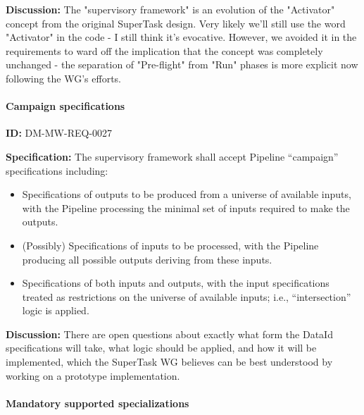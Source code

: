 \documentclass[SE,toc,lsstdraft]{lsstdoc}
\begin{document}
\textbf{Discussion:}
The "supervisory framework" is an evolution of the "Activator" concept from the original SuperTask design. Very likely we'll still use the word "Activator" in the code - I still think it's evocative. However, we avoided it in the requirements to ward off the implication that the concept was completely unchanged - the separation of "Pre-flight" from "Run" phases is more explicit now following the WG's efforts.




\paragraph{Campaign specifications}\hfill  %

\label{DM-MW-REQ-0027}
\textbf{ID:} DM-MW-REQ-0027

\textbf{Specification:}
The supervisory framework shall accept Pipeline “campaign” specifications including:



    \begin{itemize}
\item
Specifications of outputs to be produced from a universe of available inputs, with the Pipeline processing the minimal set of inputs required to make the outputs.

\item
(Possibly) Specifications of inputs to be processed, with the Pipeline producing all possible outputs deriving from these inputs.

\item
Specifications of both inputs and outputs, with the input specifications treated as restrictions on the universe of available inputs; i.e., “intersection” logic is applied.

    \end{itemize}

\textbf{Discussion:}
There are open questions about exactly what form the DataId specifications will take, what logic should be applied, and how it will be implemented, which the SuperTask WG believes can be best understood by working on a prototype implementation.




\paragraph{Mandatory supported specializations}\hfill  %
\end{document}
